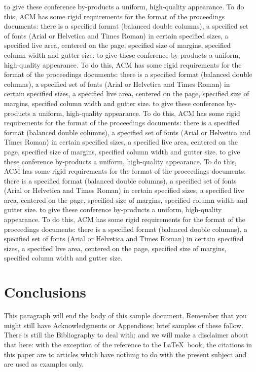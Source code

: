 to give these conference by-products a uniform, high-quality
appearance.  To do this, ACM has some rigid requirements for the
format of the proceedings documents: there is a specified format
(balanced double columns), a specified set of fonts (Arial or
Helvetica and Times Roman) in certain specified sizes, a specified
live area, centered on the page, specified size of margins, specified
column width and gutter size.
to give these conference by-products a uniform, high-quality
appearance.  To do this, ACM has some rigid requirements for the
format of the proceedings documents: there is a specified format
(balanced double columns), a specified set of fonts (Arial or
Helvetica and Times Roman) in certain specified sizes, a specified
live area, centered on the page, specified size of margins, specified
column width and gutter size.
to give these conference by-products a uniform, high-quality
appearance.  To do this, ACM has some rigid requirements for the
format of the proceedings documents: there is a specified format
(balanced double columns), a specified set of fonts (Arial or
Helvetica and Times Roman) in certain specified sizes, a specified
live area, centered on the page, specified size of margins, specified
column width and gutter size.
to give these conference by-products a uniform, high-quality
appearance.  To do this, ACM has some rigid requirements for the
format of the proceedings documents: there is a specified format
(balanced double columns), a specified set of fonts (Arial or
Helvetica and Times Roman) in certain specified sizes, a specified
live area, centered on the page, specified size of margins, specified
column width and gutter size.
to give these conference by-products a uniform, high-quality
appearance.  To do this, ACM has some rigid requirements for the
format of the proceedings documents: there is a specified format
(balanced double columns), a specified set of fonts (Arial or
Helvetica and Times Roman) in certain specified sizes, a specified
live area, centered on the page, specified size of margins, specified
column width and gutter size.


\section{Conclusions}\label{Conclusions}
This paragraph will end the body of this sample document.
Remember that you might still have Acknowledgments or
Appendices; brief samples of these
follow.  There is still the Bibliography to deal with; and
we will make a disclaimer about that here: with the exception
of the reference to the \LaTeX\ book, the citations in
this paper are to articles which have nothing to
do with the present subject and are used as
examples only.


